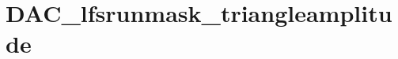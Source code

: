 \hypertarget{group___d_a_c__lfsrunmask__triangleamplitude}{\section{D\-A\-C\-\_\-lfsrunmask\-\_\-triangleamplitude}
\label{group___d_a_c__lfsrunmask__triangleamplitude}
}
